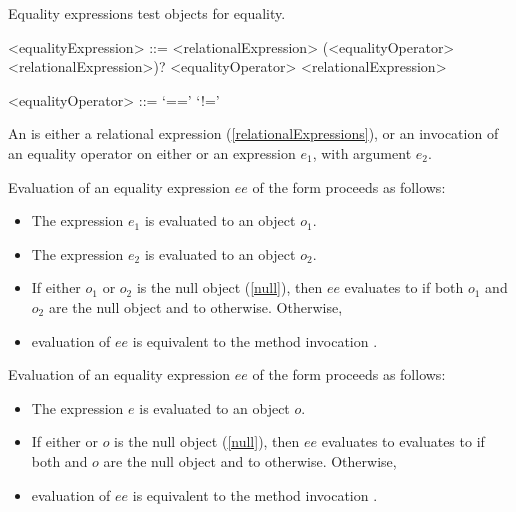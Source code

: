 \documentclass[makeidx]{article}
\begin{document}
\LMHash{}%
Equality expressions test objects for equality.

\begin{grammar}
<equalityExpression> ::= \gnewline{}
  <relationalExpression> (<equalityOperator> <relationalExpression>)?
  \alt \SUPER{} <equalityOperator> <relationalExpression>

<equalityOperator> ::= `=='
  \alt `!='
\end{grammar}

\LMHash{}%
An  is either a relational expression (\ref{relationalExpressions}), or an invocation of an equality operator on either \SUPER{} or an expression $e_1$, with argument $e_2$.

\LMHash{}%
Evaluation of an equality expression $ee$ of the form  proceeds as follows:
\begin{itemize}
\item The expression $e_1$ is evaluated to an object $o_1$.
\item The expression $e_2$ is evaluated to an object $o_2$.
\item If either $o_1$ or $o_2$ is the null object (\ref{null}), then $ee$ evaluates to \TRUE{} if both $o_1$ and $o_2$ are the null object and to \FALSE{} otherwise.
Otherwise,
\item evaluation of $ee$ is equivalent to the method invocation .
\end{itemize}

\LMHash{}%
Evaluation of an equality expression $ee$ of the form  proceeds as follows:
\begin{itemize}
\item The expression $e$ is evaluated to an object $o$.
\item If either \THIS{} or $o$ is the null object (\ref{null}), then $ee$ evaluates to evaluates to \TRUE{} if both \THIS{} and $o$ are the null object and to \FALSE{} otherwise.
Otherwise,
\item evaluation of $ee$ is equivalent to the method invocation .
\end{itemize}

\end{document}
